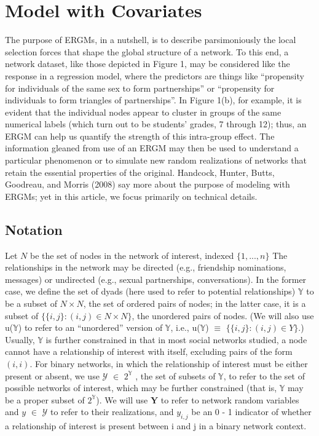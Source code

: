 \documentclass[12pt]{ociamthesis}  %
\begin{document}
	\section{Model with Covariates}
	
	The purpose of ERGMs, in a nutshell, is to describe parsimoniously the local selection forces
	that shape the global structure of a network. To this end, a network dataset, like those
	depicted in Figure 1, may be considered like the response in a regression model, where the
	predictors are things like “propensity for individuals of the same sex to form partnerships” or
	“propensity for individuals to form triangles of partnerships”. In Figure 1(b), for example, it
	is evident that the individual nodes appear to cluster in groups of the same numerical labels
	(which turn out to be students’ grades, 7 through 12); thus, an ERGM can help us quantify
	the strength of this intra-group effect. The information gleaned from use of an ERGM may
	then be used to understand a particular phenomenon or to simulate new random realizations
	of networks that retain the essential properties of the original. Handcock, Hunter, Butts,
	Goodreau, and Morris (2008) say more about the purpose of modeling with ERGMs; yet in
	this article, we focus primarily on technical details.
	
	\subsection{Notation}
	Let $N$ be the set of nodes in the network of interest, indexed $\{ 1,...,n\}$ The relationships in
	the network may be directed (e.g., friendship nominations, messages) or undirected (e.g., sexual
	partnerships, conversations). In the former case, we define the set of dyads (here used to refer
	to potential relationships) $\mathbb{Y}$ to be a subset of $N \times N$, the set of ordered pairs of nodes; in the
	latter case, it is a subset of $\{ \{i, j\} : (i, j) \in N \times N\}$, the unordered pairs of nodes. (We will also
	use u($\mathbb{Y}$) to refer to an “unordered” version of $\mathbb{Y}$, i.e., u($\mathbb{Y}$) $\equiv$ $\{\{i, j\} : (i, j) \in Y \}$.) Usually, $\mathbb{Y}$ is
	further constrained in that in most social networks studied, a node cannot have a relationship of
	interest with itself, excluding pairs of the form $(i, i)$.
	For binary networks, in which the relationship of interest must be either present or absent,
	we use $\mathcal{Y}$ $\in$ $2^{\mathbb{Y}}$
	, the set of subsets of $\mathbb{Y}$, to refer to the set of possible networks of interest, which may be further constrained (that is, $\mathbb{Y}$ may be a proper subset of $2^{\mathbb{Y}}$). We will use $\textbf{Y}$ to refer to
	network random variables and $y$ $\in$ $\mathcal{Y}$ to refer to their realizations, and $y_{i,j}$ be an 0 - 1 indicator of
	whether a relationship of interest is present between i and j in a binary network context.
	
\end{document}
